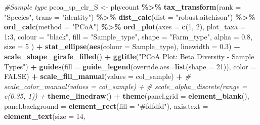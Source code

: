 \documentclass[
]{article}
\newenvironment{Shaded}{\begin{snugshade}}{\end{snugshade}}
\newcommand{\AttributeTok}[1]{\textcolor[rgb]{0.13,0.29,0.53}{#1}}
\newcommand{\CommentTok}[1]{\textcolor[rgb]{0.56,0.35,0.01}{\textit{#1}}}
\newcommand{\ConstantTok}[1]{\textcolor[rgb]{0.56,0.35,0.01}{#1}}
\newcommand{\DecValTok}[1]{\textcolor[rgb]{0.00,0.00,0.81}{#1}}
\newcommand{\FloatTok}[1]{\textcolor[rgb]{0.00,0.00,0.81}{#1}}
\newcommand{\FunctionTok}[1]{\textcolor[rgb]{0.13,0.29,0.53}{\textbf{#1}}}
\newcommand{\NormalTok}[1]{#1}
\newcommand{\OtherTok}[1]{\textcolor[rgb]{0.56,0.35,0.01}{#1}}
\newcommand{\SpecialCharTok}[1]{\textcolor[rgb]{0.81,0.36,0.00}{\textbf{#1}}}
\newcommand{\StringTok}[1]{\textcolor[rgb]{0.31,0.60,0.02}{#1}}
\begin{document}
\begin{Shaded}
\begin{Highlighting}[]
\CommentTok{\#Sample type}
\NormalTok{pcoa\_sp\_clr\_S }\OtherTok{\textless{}{-}}
\NormalTok{  phycount }\SpecialCharTok{\%\textgreater{}\%}
 \FunctionTok{tax\_transform}\NormalTok{(}\AttributeTok{rank =} \StringTok{"Species"}\NormalTok{, }
               \AttributeTok{trans =} \StringTok{"identity"}\NormalTok{) }\SpecialCharTok{\%\textgreater{}\%}  
 \FunctionTok{dist\_calc}\NormalTok{(}\AttributeTok{dist =} \StringTok{"robust.aitchison"}\NormalTok{) }\SpecialCharTok{\%\textgreater{}\%}
 \FunctionTok{ord\_calc}\NormalTok{(}\AttributeTok{method =} \StringTok{"PCoA"}\NormalTok{) }\SpecialCharTok{\%\textgreater{}\%} 
 \FunctionTok{ord\_plot}\NormalTok{(}\AttributeTok{axes =} \FunctionTok{c}\NormalTok{(}\DecValTok{1}\NormalTok{, }\DecValTok{2}\NormalTok{),}
          \AttributeTok{plot\_taxa =} \DecValTok{1}\SpecialCharTok{:}\DecValTok{3}\NormalTok{,}
          \AttributeTok{colour =} \StringTok{"black"}\NormalTok{, }
          \AttributeTok{fill =} \StringTok{"Sample\_type"}\NormalTok{,}
          \AttributeTok{shape =} \StringTok{"Farm\_type"}\NormalTok{,}
          \AttributeTok{alpha =} \FloatTok{0.8}\NormalTok{,}
          \AttributeTok{size =} \DecValTok{5}
\NormalTok{          ) }\SpecialCharTok{+} 
  \FunctionTok{stat\_ellipse}\NormalTok{(}\FunctionTok{aes}\NormalTok{(}\AttributeTok{colour =}\NormalTok{ Sample\_type), }\AttributeTok{linewidth =} \FloatTok{0.3}\NormalTok{) }\SpecialCharTok{+}
  \FunctionTok{scale\_shape\_girafe\_filled}\NormalTok{() }\SpecialCharTok{+}
  \FunctionTok{ggtitle}\NormalTok{(}\StringTok{"PCoA Plot: Beta Diversity {-} Sample Types"}\NormalTok{) }\SpecialCharTok{+}
   \FunctionTok{guides}\NormalTok{(}\AttributeTok{fill =} \FunctionTok{guide\_legend}\NormalTok{(}\AttributeTok{override.aes=}\FunctionTok{list}\NormalTok{(}\AttributeTok{shape =} \DecValTok{21}\NormalTok{)),}
          \AttributeTok{color =} \ConstantTok{FALSE}\NormalTok{) }\SpecialCharTok{+}
  \FunctionTok{scale\_fill\_manual}\NormalTok{(}\AttributeTok{values =}\NormalTok{ col\_sample) }\SpecialCharTok{+}
  \CommentTok{\# scale\_color\_manual(values = col\_sample) +}
  \CommentTok{\# scale\_alpha\_discrete(range = c(0.35, 1)) +}
  \FunctionTok{theme\_linedraw}\NormalTok{() }\SpecialCharTok{+}
  \FunctionTok{theme}\NormalTok{(}\AttributeTok{panel.grid =} \FunctionTok{element\_blank}\NormalTok{(),}
        \AttributeTok{panel.background =} \FunctionTok{element\_rect}\NormalTok{(}\AttributeTok{fill =} \StringTok{"\#fdfdfd"}\NormalTok{),}
        \AttributeTok{axis.text =} \FunctionTok{element\_text}\NormalTok{(}\AttributeTok{size =} \DecValTok{14}\NormalTok{,}

\end{Highlighting}
\end{Shaded}
\end{document}
